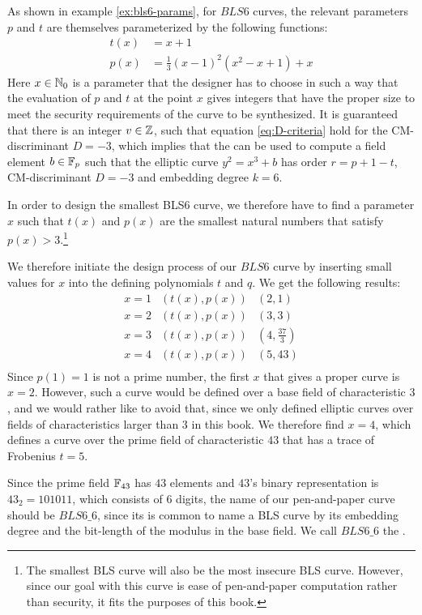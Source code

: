As shown in example \ref{ex:bls6-params}, for $BLS6$ curves, the relevant parameters $p$ and $t$ are themselves parameterized by the following functions:
\begin{equation}
\begin{split}
t(x) &= x+1\\
p(x) &= \frac{1}{3}(x-1)^2(x^{2}-x+1) +x
\end{split}
\end{equation}
Here $x\in\mathbb{N}_0$ is a parameter that the designer has to choose in such a way that the evaluation of $p$ and $t$ at the point $x$ gives integers that have the proper size to meet the security requirements of the curve to be synthesized. It is guaranteed that there is an integer $v\in\mathbb{Z}$, such that equation \ref{eq:D-criteria} hold for the CM-discriminant $D=-3$, which implies that the  can be used to compute a field element $b\in\mathbb{F}_p$ such that the elliptic curve $y^2 = x^3 +b$ has order $r=p+1-t$, CM-discriminant $D=-3$ and embedding degree $k=6$. 

In order to design the smallest BLS6 curve, we therefore have to find a parameter $x$ such that $t(x)$ and $p(x)$ are the smallest natural numbers that satisfy $p(x)>3$.\footnote{The smallest BLS curve will also be the most insecure BLS curve. However, since our goal with this curve is ease of pen-and-paper computation rather than security, it fits the purposes of this book.}

We therefore initiate the design process of our $BLS6$ curve by inserting small values for $x$ into the defining polynomials $t$ and $q$. We get the following results:
$$
\begin{array}{lcr}
x=1 & (t(x),p(x)) & (2,1)\\
x=2 & (t(x),p(x)) & (3,3)\\
x=3 & (t(x),p(x)) & (4,\frac{37}{3})\\
x=4 & (t(x),p(x)) & (5,43)\\
\end{array}
$$
Since $p(1)=1$ is not a prime number, the first $x$ that gives a proper curve is $x=2$. However, such a curve would be defined over a base field of characteristic $3$, and we would rather like to avoid that, since we only defined elliptic curves over fields of characteristics larger than $3$ in this book. We therefore find $x=4$, which defines a curve over the prime field of characteristic $43$ that has a trace of Frobenius $t=5$. 

Since the prime field $\mathbb{F}_{43}$ has $43$ elements and $43$'s binary representation is $43_2= 101011$, which consists of $6$ digits, the name of our pen-and-paper curve should be $BLS6\_6$, since its is common to name a BLS curve by its embedding degree and the bit-length of the modulus in the base field. We call $BLS6\_6$ the .

